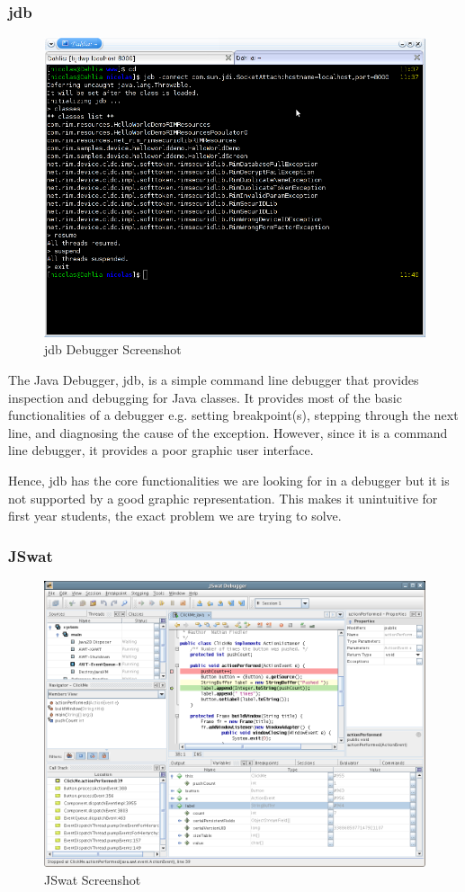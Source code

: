 \documentclass[11pt, a4paper]{article}
\begin{document}
\subsubsection{jdb}
\begin{figure}[h!]
\centering
\includegraphics[width=125mm]{jdb.png}
\caption{jdb Debugger Screenshot}
\end{figure}

The Java Debugger, jdb, is a simple command line debugger that provides inspection and debugging for Java classes.
It provides most of the basic functionalities of a debugger e.g. setting breakpoint(s), stepping through the next line, and diagnosing the cause of the exception.
However, since it is a command line debugger, it provides a poor graphic user interface.

Hence, jdb has the core functionalities we are looking for in a debugger but it is not supported by a good graphic representation. This makes it unintuitive for first year students, the exact problem we are trying to solve.
\subsubsection{JSwat}
\begin{figure}[h!]
\centering
\includegraphics[width=125mm]{jswat.png}
\caption{JSwat Screenshot}
\end{figure}
\end{document}
